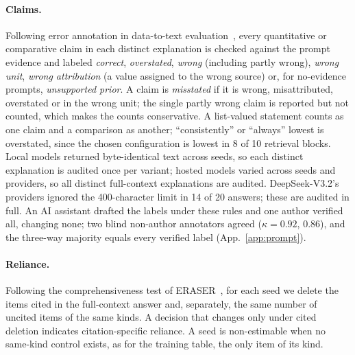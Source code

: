 \paragraph{Claims.}
Following error annotation in data-to-text evaluation~\cite{Thomson2020GoldStandard}, every quantitative or comparative claim in each distinct explanation is checked against the prompt evidence and labeled \emph{correct}, \emph{overstated}, \emph{wrong} (including partly wrong), \emph{wrong unit}, \emph{wrong attribution} (a value assigned to the wrong source) or, for no-evidence prompts, \emph{unsupported prior}. A claim is \emph{misstated} if it is wrong, misattributed, overstated or in the wrong unit; the single partly wrong claim is reported but not counted, which makes the counts conservative. A list-valued statement counts as one claim and a comparison as another; ``consistently'' or ``always'' lowest is overstated, since the chosen configuration is lowest in 8 of 10 retrieval blocks. Local models returned byte-identical text across seeds, so each distinct explanation is audited once per variant; hosted models varied across seeds and providers, so all distinct full-context explanations are audited. DeepSeek-V3.2's providers ignored the 400-character limit in 14 of 20 answers; these are audited in full. An AI assistant drafted the labels under these rules and one author verified all, changing none; two blind non-author annotators agreed ($\kappa=0.92$, $0.86$), and the three-way majority equals every verified label (App.~\ref{app:prompt}).

\paragraph{Reliance.}
Following the comprehensiveness test of ERASER~\cite{DeYoung2020ERASER}, for each seed we delete the items cited in the full-context answer and, separately, the same number of uncited items of the same kinds. A decision that changes only under cited deletion indicates citation-specific reliance. A seed is non-estimable when no same-kind control exists, as for the training table, the only item of its kind.
